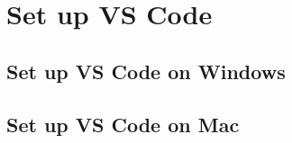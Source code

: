 \chapter{Set up VS Code}\label{ch:set-up-vs-code}


\section{Set up VS Code on Windows}\label{sec:set-up-vs-code-on-windows}


\section{Set up VS Code on Mac}\label{sec:set-up-vs-code-on-mac}
